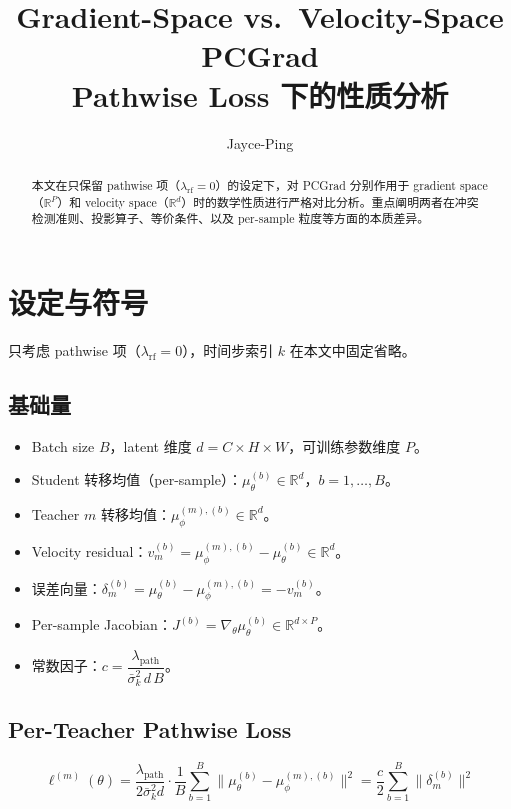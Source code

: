 \documentclass[11pt,a4paper]{article}
\title{\textbf{Gradient-Space vs.\ Velocity-Space PCGrad}\\[0.3em]
\large Pathwise Loss 下的性质分析}
\author{Jayce-Ping}
\date{}
\newcommand{\R}{\mathbb{R}}
\newcommand{\mutheta}{\mu_\theta}
\newcommand{\muphi}{\mu_\phi}
\newcommand{\sigbar}{\bar{\sigma}}
\newcommand{\lpath}{\lambda_{\mathrm{path}}}
\newcommand{\lrf}{\lambda_{\mathrm{rf}}}
\theoremstyle{definition}
\begin{document}
\maketitle

\begin{abstract}
本文在只保留 pathwise 项（$\lrf = 0$）的设定下，对 PCGrad 分别作用于 gradient space（$\R^P$）和 velocity space（$\R^d$）时的数学性质进行严格对比分析。重点阐明两者在冲突检测准则、投影算子、等价条件、以及 per-sample 粒度等方面的本质差异。
\end{abstract}

\tableofcontents
\newpage

\section{设定与符号}

只考虑 pathwise 项（$\lrf = 0$），时间步索引 $k$ 在本文中固定省略。

\subsection{基础量}

\begin{itemize}[leftmargin=1.5em]
\item Batch size $B$，latent 维度 $d = C\!\times\!H\!\times\!W$，可训练参数维度 $P$。
\item Student 转移均值（per-sample）：$\mutheta^{(b)} \in \R^d$，$b = 1,\ldots,B$。
\item Teacher $m$ 转移均值：$\muphi^{(m),(b)} \in \R^d$。
\item Velocity residual：$v_m^{(b)} = \muphi^{(m),(b)} - \mutheta^{(b)} \in \R^d$。
\item 误差向量：$\delta_m^{(b)} = \mutheta^{(b)} - \muphi^{(m),(b)} = -v_m^{(b)}$。
\item Per-sample Jacobian：$J^{(b)} = \nabla_\theta \mutheta^{(b)} \in \R^{d \times P}$。
\item 常数因子：$c = \dfrac{\lpath}{\sigbar_k^2\, d\, B}$。
\end{itemize}

\subsection{Per-Teacher Pathwise Loss}

\begin{equation}
\ell^{(m)}(\theta) = \frac{\lpath}{2\sigbar_k^2 d}\cdot\frac{1}{B}\sum_{b=1}^B \|\mutheta^{(b)} - \muphi^{(m),(b)}\|^2
= \frac{c}{2}\sum_{b=1}^B \|\delta_m^{(b)}\|^2
\label{eq:pathwise_loss}
\end{equation}
\end{document}
